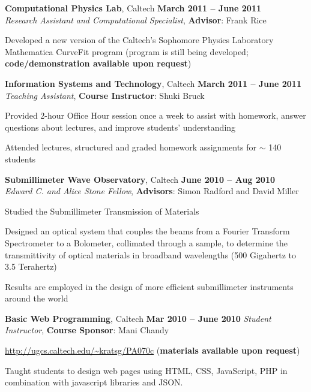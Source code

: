\documentclass[margin,line]{resume}
\begin{document}
\begin{resume}
\textbf{Computational Physics Lab}, Caltech \hfill \textbf{March 2011 -- June 2011}\\
\textsl{Research Assistant and Computational Specialist}, \textbf{Advisor}: Frank Rice
\begin{list2}
  \item Developed a new version of the Caltech's Sophomore Physics Laboratory Mathematica CurveFit program (program is still being developed; \textbf{code/demonstration available upon request})
\end{list2}

\textbf{Information Systems and Technology}, Caltech \hfill \textbf{March 2011 -- June 2011}\\
\textsl{Teaching Assistant}, \textbf{Course Instructor}: Shuki Bruck
\begin{list2}
  \item Provided 2-hour Office Hour session once a week to assist with homework, answer questions about lectures, and improve students' understanding
  \item Attended lectures, structured and graded homework assignments for $\sim$ 140 students
\end{list2}

\textbf{Submillimeter Wave Observatory}, Caltech \hfill \textbf{June 2010 -- Aug 2010}\\
\textsl{Edward C. and Alice Stone Fellow}, \textbf{Advisors}: Simon Radford and David Miller
\begin{list2}
  \item Studied the Submillimeter Transmission of Materials
  \item Designed an optical system that couples the beams from a Fourier Transform Spectrometer to a Bolometer, collimated through a sample, to determine the transmittivity of optical materials in broadband wavelengths (500 Gigahertz to 3.5 Terahertz)
  \item Results are employed in the design of more efficient submillimeter instruments around the world
\end{list2}

\textbf{Basic Web Programming}, Caltech \hfill \textbf{Mar 2010 -- June 2010}
\textsl{Student Instructor}, \textbf{Course Sponsor}: Mani Chandy
\begin{list2}
  \item \url{http://ugcs.caltech.edu/~kratsg/PA070c} (\textbf{materials available upon request})
  \item Taught students to design web pages using HTML, CSS, JavaScript, PHP in combination with javascript libraries and JSON.
\end{list2}


\end{resume}
\end{document}
